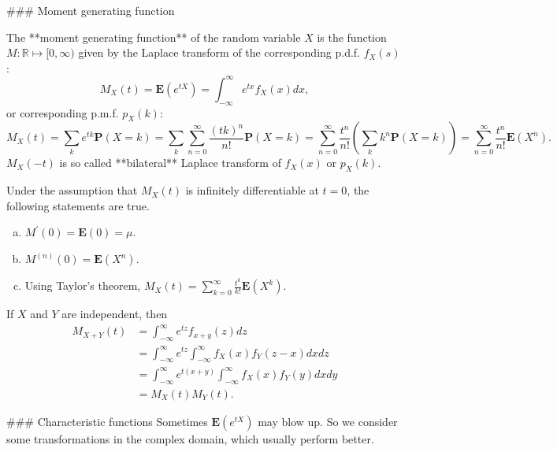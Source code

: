 ### Moment generating function
\begin{definition}
The **moment generating function** of the random variable $X$ is the function $M: \mathbb{R} \mapsto [0, \infty)$ given by the Laplace transform of the corresponding p.d.f. $f_X(s)$:
\begin{equation*}
    M_X(t) = \mathbf{E} \left( e^{tX} \right) = \int_{-\infty}^\infty e^{tx} f_X(x) dx,
\end{equation*}
or corresponding p.m.f. $p_X(k)$:
\begin{equation*}
    M_X(t) = \sum_{k} e^{t k} \mathbf{P}(X=k) 
    = \sum_k \sum_{n=0}^{\infty} \frac{(t k)^{n}}{n !} \mathbf{P}(X=k)
    = \sum_{n=0}^{\infty} \frac{t^{n}}{n !}\left(\sum_k k^{n} \mathbf{P}(X=k)\right) 
    = \sum_{n=0}^{\infty} \frac{t^{n}}{n !} \mathbf{E}\left(X^{n}\right).
\end{equation*}
$M_X(-t)$ is so called **bilateral** Laplace transform of $f_X(x)$ or $p_X(k)$.
\end{definition}

Under the assumption that $M_X(t)$ is infinitely differentiable at $t=0$, the following statements are true. 
\begin{enumerate}[(a)]
    \item $M^\prime(0) = \mathbf{E}(0) = \mu$.
    \item $M^{(n)}(0) = \mathbf{E}(X^n)$.
    \item Using Taylor's theorem, $M_X(t) = \sum_{k=0}^\infty \frac{t^k}{k!} \mathbf{E}(X^k)$.
\end{enumerate}

\begin{theorem}
If $X$ and $Y$ are independent, then
\begin{equation*}
    \begin{split}
        M_{X+Y}(t) &= \int_{-\infty}^\infty e^{tz} f_{x+y}(z) dz \\
        &= \int_{-\infty}^\infty e^{tz} \int_{-\infty}^\infty f_X(x) f_Y(z-x) dx dz \\
        &= \int_{-\infty}^\infty e^{t(x+y)} \int_{-\infty}^\infty f_X(x) f_Y(y) dx dy \\
        &= M_X(t) M_Y(t).
    \end{split}
\end{equation*}
\end{theorem}

### Characteristic functions
Sometimes $\mathbf{E}(e^{tX})$ may blow up. So we consider some transformations in the complex domain, which usually perform better.

